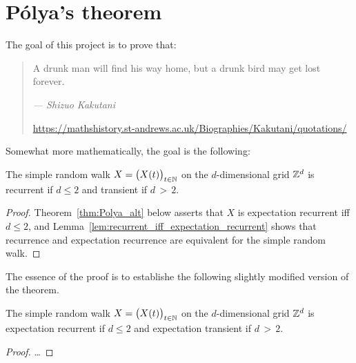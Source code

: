 \chapter{P\'olya's theorem}

The goal of this project is to prove that:
\begin{quote}
A drunk man will find his way home, but a drunk bird may get lost forever.

\emph{--- Shizuo Kakutani}

\url{https://mathshistory.st-andrews.ac.uk/Biographies/Kakutani/quotations/}
\end{quote}


Somewhat more mathematically, the goal is the following:

\begin{theorem}
  \label{thm:Polya}
  The simple random walk $X = \big( X(t) \big)_{t \in \mathbb{N}}$
  on the $d$-dimensional grid $\mathbb{Z}^d$ is recurrent if $d \le 2$
  and transient if $d \, > \, 2$.
\end{theorem}
\begin{proof}
Theorem~\ref{thm:Polya_alt} below asserts that $X$
is expectation recurrent iff $d \le 2$,
and Lemma~\ref{lem:recurrent_iff_expectation_recurrent}
shows that recurrence and expectation recurrence are equivalent
for the simple random walk.
\end{proof}

The essence of the proof is to establishe the following slightly modified
version of the theorem.

\begin{theorem}
  \label{thm:Polya_alt}
  The simple random walk $X = \big( X(t) \big)_{t \in \mathbb{N}}$
  on the $d$-dimensional grid $\mathbb{Z}^d$ is expectation recurrent if $d \le 2$
  and expectation transient if $d \, > \, 2$.
\end{theorem}
\begin{proof}
\ldots
\end{proof}
